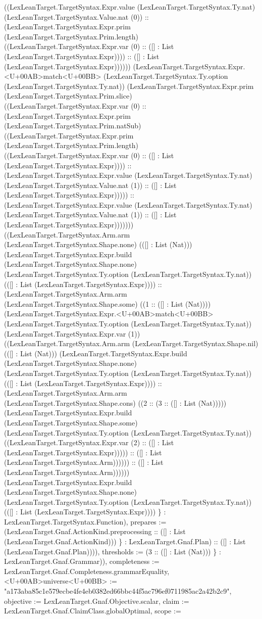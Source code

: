 \documentclass[11pt]{article}
\begin{document}
((LexLeanTarget.TargetSyntax.Expr.value (LexLeanTarget.TargetSyntax.Ty.nat) (LexLeanTarget.TargetSyntax.Value.nat (0)) :: (LexLeanTarget.TargetSyntax.Expr.prim (LexLeanTarget.TargetSyntax.Prim.length) ((LexLeanTarget.TargetSyntax.Expr.var (0) :: ([] : List (LexLeanTarget.TargetSyntax.Expr)))) :: ([] : List (LexLeanTarget.TargetSyntax.Expr)))))) (LexLeanTarget.TargetSyntax.Expr.<U+00AB>match<U+00BB> (LexLeanTarget.TargetSyntax.Ty.option (LexLeanTarget.TargetSyntax.Ty.nat)) (LexLeanTarget.TargetSyntax.Expr.prim (LexLeanTarget.TargetSyntax.Prim.slice) ((LexLeanTarget.TargetSyntax.Expr.var (0) :: (LexLeanTarget.TargetSyntax.Expr.prim (LexLeanTarget.TargetSyntax.Prim.natSub) ((LexLeanTarget.TargetSyntax.Expr.prim (LexLeanTarget.TargetSyntax.Prim.length) ((LexLeanTarget.TargetSyntax.Expr.var (0) :: ([] : List (LexLeanTarget.TargetSyntax.Expr)))) :: (LexLeanTarget.TargetSyntax.Expr.value (LexLeanTarget.TargetSyntax.Ty.nat) (LexLeanTarget.TargetSyntax.Value.nat (1)) :: ([] : List (LexLeanTarget.TargetSyntax.Expr))))) :: (LexLeanTarget.TargetSyntax.Expr.value (LexLeanTarget.TargetSyntax.Ty.nat) (LexLeanTarget.TargetSyntax.Value.nat (1)) :: ([] : List (LexLeanTarget.TargetSyntax.Expr))))))) ((LexLeanTarget.TargetSyntax.Arm.arm (LexLeanTarget.TargetSyntax.Shape.none) (([] : List (Nat))) (LexLeanTarget.TargetSyntax.Expr.build (LexLeanTarget.TargetSyntax.Shape.none) (LexLeanTarget.TargetSyntax.Ty.option (LexLeanTarget.TargetSyntax.Ty.nat)) (([] : List (LexLeanTarget.TargetSyntax.Expr)))) :: (LexLeanTarget.TargetSyntax.Arm.arm (LexLeanTarget.TargetSyntax.Shape.some) ((1 :: ([] : List (Nat)))) (LexLeanTarget.TargetSyntax.Expr.<U+00AB>match<U+00BB> (LexLeanTarget.TargetSyntax.Ty.option (LexLeanTarget.TargetSyntax.Ty.nat)) (LexLeanTarget.TargetSyntax.Expr.var (1)) ((LexLeanTarget.TargetSyntax.Arm.arm (LexLeanTarget.TargetSyntax.Shape.nil) (([] : List (Nat))) (LexLeanTarget.TargetSyntax.Expr.build (LexLeanTarget.TargetSyntax.Shape.none) (LexLeanTarget.TargetSyntax.Ty.option (LexLeanTarget.TargetSyntax.Ty.nat)) (([] : List (LexLeanTarget.TargetSyntax.Expr)))) :: (LexLeanTarget.TargetSyntax.Arm.arm (LexLeanTarget.TargetSyntax.Shape.cons) ((2 :: (3 :: ([] : List (Nat))))) (LexLeanTarget.TargetSyntax.Expr.build (LexLeanTarget.TargetSyntax.Shape.some) (LexLeanTarget.TargetSyntax.Ty.option (LexLeanTarget.TargetSyntax.Ty.nat)) ((LexLeanTarget.TargetSyntax.Expr.var (2) :: ([] : List (LexLeanTarget.TargetSyntax.Expr))))) :: ([] : List (LexLeanTarget.TargetSyntax.Arm)))))) :: ([] : List (LexLeanTarget.TargetSyntax.Arm)))))) (LexLeanTarget.TargetSyntax.Expr.build (LexLeanTarget.TargetSyntax.Shape.none) (LexLeanTarget.TargetSyntax.Ty.option (LexLeanTarget.TargetSyntax.Ty.nat)) (([] : List (LexLeanTarget.TargetSyntax.Expr)))) \} : LexLeanTarget.TargetSyntax.Function), prepares := (LexLeanTarget.Gnaf.ActionKind.preprocessing :: ([] : List (LexLeanTarget.Gnaf.ActionKind))) \} : LexLeanTarget.Gnaf.Plan) :: ([] : List (LexLeanTarget.Gnaf.Plan)))), thresholds := (3 :: ([] : List (Nat))) \} : LexLeanTarget.Gnaf.Grammar)), completeness := LexLeanTarget.Gnaf.Completeness.grammarEquality, <U+00AB>universe<U+00BB> := "a173aba85c1e579ecbe4fe4eb0382ed66bbc44f5ac796ef0711985ac2a42b2c9", objective := LexLeanTarget.Gnaf.Objective.scalar, claim := LexLeanTarget.Gnaf.ClaimClass.globalOptimal, scope := 
\end{document}
